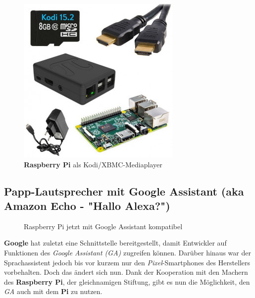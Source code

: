 \documentclass[12pt,a4paper]{article}
\newcommand{\rp}{\textbf{Raspberry Pi}\xspace}
\begin{document}
\begin{figure}[H]
\centering
\includegraphics[scale=.8]{kodi}
\caption{\rp als Kodi/XBMC-Mediaplayer}
\label{fig:kodi}
\end{figure}

\subsection{Papp-Lautsprecher mit Google Assistant (aka Amazon Echo - "Hallo Alexa?")}

\begin{figure}[H]
\centering
{}
\qquad
{}
\caption{Raspberry Pi jetzt mit Google Assistant kompatibel}
\label{fig:aiy}
\end{figure}

\textbf{Google} hat zuletzt eine Schnittstelle bereitgestellt, damit Entwickler auf Funktionen des \textit{Google Assistant (GA)} zugreifen können. Darüber hinaus war der Sprachassistent jedoch bis vor kurzem nur den \textit{Pixel}-Smartphones des Herstellers vorbehalten. Doch das ändert sich nun. Dank der Kooperation mit den Machern des \rp, der gleichnamigen Stiftung, gibt es nun die Möglichkeit, den \textit{GA} auch mit dem \textbf{Pi} zu nutzen.
\end{document}
